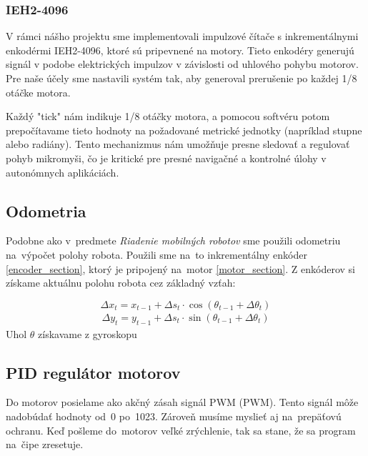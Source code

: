 \subsubsection{IEH2-4096}
V rámci nášho projektu sme implementovali impulzové čítače s inkrementálnymi enkodérmi IEH2-4096, ktoré sú pripevnené na motory. Tieto enkodéry generujú signál v podobe elektrických impulzov v závislosti od uhlového pohybu motorov. Pre naše účely sme nastavili systém tak, aby generoval prerušenie po každej 1/8 otáčke motora.

Každý "tick" nám indikuje 1/8 otáčky motora, a pomocou softvéru potom prepočítavame tieto hodnoty na požadované metrické jednotky (napríklad stupne alebo radiány). Tento mechanizmus nám umožňuje presne sledovať a regulovať pohyb mikromyši, čo je kritické pre presné navigačné a kontrolné úlohy v autonómnych aplikáciách.
\newpage
\subsection{Odometria}
\label{subsec:odometria}

Podobne ako v~predmete \textit{Riadenie mobilných robotov} sme použili odometriu na~výpočet polohy robota.
Použili sme na~to inkrementálny enkóder \ref{encoder_section}, ktorý je pripojený na~motor \ref{motor_section}. Z enkóderov si získame aktuálnu polohu robota
cez základný vzťah:

\begin{equation}
	\label{eq:odometria}
	 \Delta x_t = x_{t-1} + \Delta s_t \cdot \cos(\theta_{t-1} + \Delta \theta_t)
\end{equation}
\begin{align*}
	\Delta y_t = y_{t-1} + \Delta s_t \cdot \sin(\theta_{t-1} + \Delta \theta_t)
\end{align*}
Uhol $\theta$ získavame z gyroskopu 


\newpage

\subsection{PID regulátor motorov}
\label{subsec:pid}

Do motorov posielame ako akčný zásah signál PWM (\acrlong{PWM}). Tento signál môže nadobúdať hodnoty od~0 po~1023.
Zároveň musíme myslieť aj na~prepäťovú ochranu. Keď pošleme do~motorov veľké zrýchlenie, tak sa stane, že sa program
na~čipe zresetuje.

